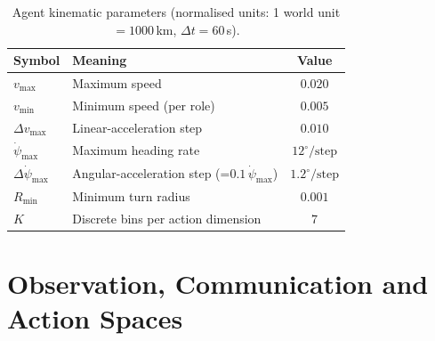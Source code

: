 \begin{table}[H]
\centering
\caption{Agent kinematic parameters (normalised units: 1 world unit $=1000$\,km,
$\Delta t = 60$\,s).}
\label{tab:kin_params}
\begin{tabular}{@{}llc@{}}
\toprule
Symbol & Meaning & Value \\ \midrule
$v_{\max}$              & Maximum speed                           & $0.020$ \\
$v_{\min}$              & Minimum speed (per role)                & $0.005$ \\
$\Delta v_{\max}$       & Linear-acceleration step                & $0.010$ \\
$\dot{\psi}_{\max}$     & Maximum heading rate                    & $12^{\circ}/\text{step}$ \\
$\Delta\dot{\psi}_{\max}$ & Angular-acceleration step (=$0.1\,\dot{\psi}_{\max}$) & $1.2^{\circ}/\text{step}$ \\
$R_{\min}$              & Minimum turn radius                     & $0.001$ \\
$K$                     & Discrete bins per action dimension      & $7$ \\
\bottomrule
\end{tabular}
\end{table}

\section{Observation, Communication and Action Spaces}
\label{sec:obs_comm}

